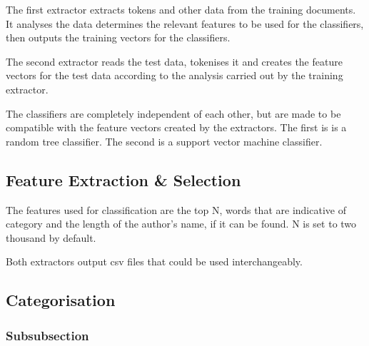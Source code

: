 \documentclass[11pt]{article}
\begin{document}
The first extractor extracts tokens and other data from the training documents.
It analyses the data determines the relevant features to be used for the
classifiers, then outputs the training vectors for the classifiers. 

The second extractor reads the test data, tokenises it and creates the feature
vectors for the test data according to the analysis carried out by the training
extractor.

The classifiers are completely independent of each other, but are made to be
compatible with the feature vectors created by the extractors. The first is is a
random tree classifier. The second is a support vector machine classifier.

\subsection{Feature Extraction & Selection}

The features used for classification are the top N, words that are indicative of
category and the length of the author's name, if it can be found. N is set to
two thousand by default.

Both extractors output csv files that could be used interchangeably.


\subsection{Categorisation}


 
\subsubsection{Subsubsection}


\begin{comment}
    \begin{table}[h]
     \begin{center}
        \begin{tabular}{|l|l|}

              \hline
              Corpus & Features\\
              \hline\hline
              AAA & 1M words\\
              BBB & spoken corpus (expensive)\\
              CCC & 2M words\\
                & free (to academics)\\
              \hline

        \end{tabular}
    \caption{The caption of the table}\label{table1}
     \end{center}
    \end{table}
\end{comment}
\end{document}
